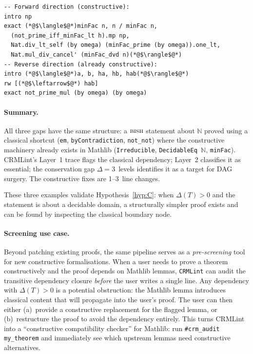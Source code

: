 \documentclass[12pt, a4paper]{article}
\theoremstyle{plain}
\theoremstyle{definition}
\theoremstyle{remark}
\newcommand{\BISH}{\textsc{bish}}
\newcommand{\CRMLint}{\texttt{CRMLint}}
\begin{document}
\begin{lstlisting}
-- Forward direction (constructive):
intro np
exact (*@$\langle$@*)minFac n, n / minFac n,
  (not_prime_iff_minFac_lt h).mp np,
  Nat.div_lt_self (by omega) (minFac_prime (by omega)).one_lt,
  Nat.mul_div_cancel' (minFac_dvd n)(*@$\rangle$@*)
-- Reverse direction (already constructive):
intro (*@$\langle$@*)a, b, ha, hb, hab(*@$\rangle$@*)
rw [(*@$\leftarrow$@*) hab]
exact not_prime_mul (by omega) (by omega)
\end{lstlisting}

\paragraph{Summary.}
All three gaps have the same structure: a $\BISH$ statement about
$\mathbb{N}$ proved using a classical shortcut (\texttt{em},
\texttt{byContradiction}, \texttt{not\_not}) where the constructive
machinery already exists in Mathlib (\texttt{Irreducible},
\texttt{DecidableEq~$\mathbb{N}$}, \texttt{minFac}).
CRMLint's Layer~1 trace flags the classical dependency;
Layer~2 classifies it as essential; the conservation gap
$\Delta = 3$~levels identifies it as a target for DAG surgery.
The constructive fixes are 1--3~line changes.

These three examples validate Hypothesis~\ref{hyp:C}: when
$\Delta(T) > 0$ and the statement is about a decidable domain,
a structurally simpler proof exists and can be found by inspecting
the classical boundary node.

\paragraph{Screening use case.}
Beyond patching existing proofs, the same pipeline serves as a
\emph{pre-screening} tool for new constructive formalisations.
When a user needs to prove a theorem constructively and the proof
depends on Mathlib lemmas, \CRMLint{} can audit the transitive
dependency closure \emph{before} the user writes a single line.
Any dependency with $\Delta(T) > 0$ is a potential obstruction:
the Mathlib lemma introduces classical content that will propagate
into the user's proof.  The user can then either (a)~provide a
constructive replacement for the flagged lemma, or (b)~restructure
the proof to avoid the dependency entirely.  This turns CRMLint into
a ``constructive compatibility checker'' for Mathlib: run
\texttt{\#crm\_audit my\_theorem} and immediately see which upstream
lemmas need constructive alternatives.
\end{document}
